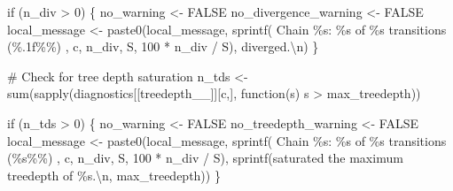 \documentclass[
  letterpaper,
  DIV=11,
  numbers=noendperiod]{scrartcl}
\newenvironment{Shaded}{\begin{snugshade}}{\end{snugshade}}
\newcommand{\CommentTok}[1]{\textcolor[rgb]{0.37,0.37,0.37}{#1}}
\newcommand{\ConstantTok}[1]{\textcolor[rgb]{0.56,0.35,0.01}{#1}}
\newcommand{\ControlFlowTok}[1]{\textcolor[rgb]{0.00,0.23,0.31}{#1}}
\newcommand{\DecValTok}[1]{\textcolor[rgb]{0.68,0.00,0.00}{#1}}
\newcommand{\FunctionTok}[1]{\textcolor[rgb]{0.28,0.35,0.67}{#1}}
\newcommand{\NormalTok}[1]{\textcolor[rgb]{0.00,0.23,0.31}{#1}}
\newcommand{\OtherTok}[1]{\textcolor[rgb]{0.00,0.23,0.31}{#1}}
\newcommand{\SpecialCharTok}[1]{\textcolor[rgb]{0.37,0.37,0.37}{#1}}
\newcommand{\StringTok}[1]{\textcolor[rgb]{0.13,0.47,0.30}{#1}}
\begin{document}
\begin{Shaded}
\begin{Highlighting}[]
    \ControlFlowTok{if}\NormalTok{ (n\_div }\SpecialCharTok{\textgreater{}} \DecValTok{0}\NormalTok{) \{}
\NormalTok{      no\_warning }\OtherTok{\textless{}{-}} \ConstantTok{FALSE}
\NormalTok{      no\_divergence\_warning }\OtherTok{\textless{}{-}} \ConstantTok{FALSE}
\NormalTok{      local\_message }\OtherTok{\textless{}{-}} 
        \FunctionTok{paste0}\NormalTok{(local\_message,}
               \FunctionTok{sprintf}\NormalTok{(}\StringTok{\textquotesingle{}  Chain \%s: \%s of \%s transitions (\%.1f\%\%) \textquotesingle{}}\NormalTok{, }
\NormalTok{                       c, n\_div, S, }\DecValTok{100} \SpecialCharTok{*}\NormalTok{ n\_div }\SpecialCharTok{/}\NormalTok{ S),}
               \StringTok{\textquotesingle{}diverged.}\SpecialCharTok{\textbackslash{}n}\StringTok{\textquotesingle{}}\NormalTok{)}
\NormalTok{    \}}
    
    \CommentTok{\# Check for tree depth saturation}
\NormalTok{    n\_tds }\OtherTok{\textless{}{-}} \FunctionTok{sum}\NormalTok{(}\FunctionTok{sapply}\NormalTok{(diagnostics[[}\StringTok{\textquotesingle{}treedepth\_\_\textquotesingle{}}\NormalTok{]][c,], }
                        \ControlFlowTok{function}\NormalTok{(s) s }\SpecialCharTok{\textgreater{}}\NormalTok{ max\_treedepth))}
    
    \ControlFlowTok{if}\NormalTok{ (n\_tds }\SpecialCharTok{\textgreater{}} \DecValTok{0}\NormalTok{) \{}
\NormalTok{      no\_warning }\OtherTok{\textless{}{-}} \ConstantTok{FALSE}
\NormalTok{      no\_treedepth\_warning }\OtherTok{\textless{}{-}} \ConstantTok{FALSE}
\NormalTok{      local\_message }\OtherTok{\textless{}{-}} 
        \FunctionTok{paste0}\NormalTok{(local\_message,}
               \FunctionTok{sprintf}\NormalTok{(}\StringTok{\textquotesingle{}  Chain \%s: \%s of \%s transitions (\%s\%\%) \textquotesingle{}}\NormalTok{, }
\NormalTok{                       c, n\_div, S, }\DecValTok{100} \SpecialCharTok{*}\NormalTok{ n\_div }\SpecialCharTok{/}\NormalTok{ S),}
               \FunctionTok{sprintf}\NormalTok{(}\StringTok{\textquotesingle{}saturated the maximum treedepth of \%s.}\SpecialCharTok{\textbackslash{}n}\StringTok{\textquotesingle{}}\NormalTok{, }
\NormalTok{                       max\_treedepth))}
\NormalTok{    \}}
    

\end{Highlighting}
\end{Shaded}
\end{document}
